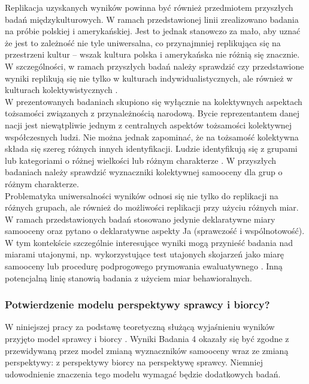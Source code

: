 \documentclass[man]{apa6}
\begin{document}
Replikacja uzyskanych wyników powinna być również przedmiotem przyszłych badań międzykulturowych. W ramach przedstawionej linii zrealizowano badania na próbie polskiej i amerykańskiej. Jest to jednak stanowczo za mało, aby uznać że jest to zależność nie tyle uniwersalna, co przynajmniej replikująca się na przestrzeni kultur -- wszak kultura polska i amerykańska nie różnią się znacznie. W szczególności, w ramach przyszłych badań należy sprawdzić czy przedstawione wyniki replikują się nie tylko w kulturach indywidualistycznych, ale również w kulturach kolektywistycznych \parencite[patrz np.,][]{markus1991culture}. \\

W prezentowanych badaniach skupiono się wyłącznie na kolektywnych aspektach tożsamości związanych z przynależnością narodową. Bycie reprezentantem danej nacji jest niewątpliwie jednym z centralnych aspektów tożsamości kolektywnej współczesnych ludzi. Nie można jednak zapominać, że na tożsamość kolektywna składa się szereg różnych innych identyfikacji. Ludzie identyfikują się z grupami lub kategoriami o różnej wielkości lub różnym charakterze \parencite[patrz np.,][]{lickel2000varieties}. W przyszłych badaniach należy sprawdzić wyznaczniki kolektywnej samooceny dla grup o różnym charakterze.\\

Problematyka uniwersalności wyników odnosi się nie tylko do replikacji na różnych grupach, ale również do możliwości replikacji przy użyciu różnych miar. W ramach przedstawionych badań stosowano jedynie deklaratywne miary samooceny oraz pytano o deklaratywne aspekty Ja (sprawczość i wspólnotowość). W tym kontekście szczególnie interesujące wyniki mogą przynieść badania nad miarami utajonymi, np. wykorzystujące test utajonych skojarzeń jako miarę samooceny \parencite{greenwald2000using} lub procedurę podprogowego prymowania ewaluatywnego \parencite{dijksterhuis2004like}. Inną potencjalną linię stanowią badania z użyciem miar behawioralnych.\\

\subsubsection{Potwierdzenie modelu perspektywy sprawcy i biorcy?}

W niniejszej pracy za podstawę teoretyczną służącą wyjaśnieniu wyników przyjęto model sprawcy i biorcy \parencite{abele2014communal}. Wyniki Badania 4 okazały się być zgodne z przewidywaną przez model zmianą wyznaczników samooceny wraz ze zmianą perspektywy: z perspektywy biorcy na perspektywę sprawcy. Niemniej udowodnienie znaczenia tego modelu wymagać będzie dodatkowych badań.\\
\end{document}
